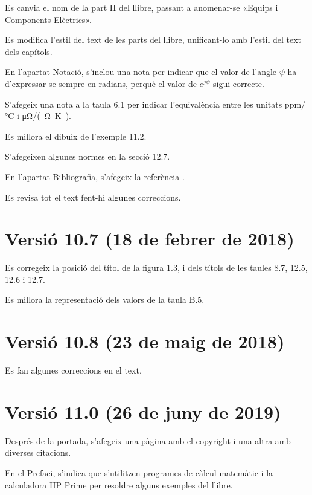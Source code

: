 Es canvia el nom de la part II del llibre, passant a anomenar-se «Equips i Components Elèctrics».

Es modifica l'estil del text de les parts del llibre, unificant-lo amb l'estil del text dels capítols.

En l'apartat Notació, s'inclou una nota per indicar  que el valor de l'angle $\psi$ ha d'expressar-se sempre en radians, perquè el valor de $e^{j\psi}$ sigui correcte.

S'afegeix una nota a la taula 6.1 per indicar l'equivalència entre les unitats \unit{ppm/\degreeCelsius}  i \unit{\micro\ohm/(\ohm.\kelvin)}.

Es millora el dibuix de l'exemple 11.2.

S’afegeixen algunes normes en la secció 12.7.

En l'apartat Bibliografia, s'afegeix la referència \cite{BUR}.

Es revisa tot el text fent-hi algunes correccions.


\section*{Versió 10.7 (18 de febrer de 2018)}

Es corregeix la posició del títol de la figura 1.3, i dels títols de les taules 8.7, 12.5, 12.6 i 12.7.

Es millora la representació dels valors de la taula B.5.

\section*{Versió 10.8 (23 de maig de 2018)}

Es fan algunes correccions en el text.


\section*{Versió 11.0 (26 de juny de 2019)}

Després de la portada, s'afegeix una pàgina amb el copyright i una altra amb diverses citacions.

En el Prefaci, s'indica que s’utilitzen programes de càlcul matemàtic i la calculadora \textsf{HP Prime}
per resoldre alguns  exemples del llibre.

